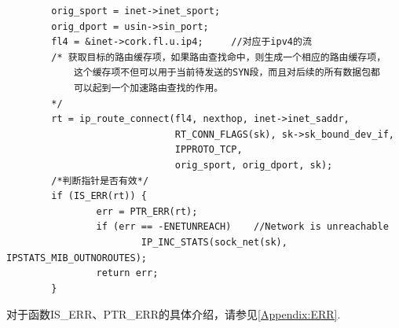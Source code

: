 \begin{verbatim}
        orig_sport = inet->inet_sport;
        orig_dport = usin->sin_port;
        fl4 = &inet->cork.fl.u.ip4;     //对应于ipv4的流
        /* 获取目标的路由缓存项，如果路由查找命中，则生成一个相应的路由缓存项，
			这个缓存项不但可以用于当前待发送的SYN段，而且对后续的所有数据包都
			可以起到一个加速路由查找的作用。
		*/
        rt = ip_route_connect(fl4, nexthop, inet->inet_saddr,
                              RT_CONN_FLAGS(sk), sk->sk_bound_dev_if,
                              IPPROTO_TCP,
                              orig_sport, orig_dport, sk);
        /*判断指针是否有效*/        
        if (IS_ERR(rt)) {
                err = PTR_ERR(rt);
                if (err == -ENETUNREACH)    //Network is unreachable
                        IP_INC_STATS(sock_net(sk), IPSTATS_MIB_OUTNOROUTES);
                return err;
        }
\end{verbatim}

		对于函数IS\_ERR、PTR\_ERR的具体介绍，请参见\ref{Appendix:ERR}.

